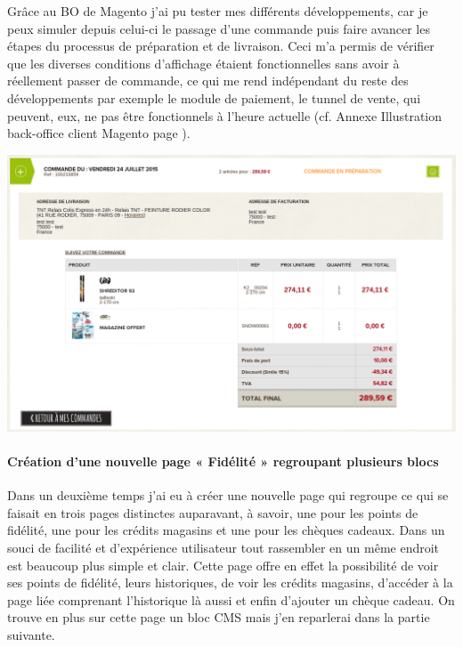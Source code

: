 \documentclass[a4paper,11pt,twoside]{report}
\begin{document}
    	Grâce au BO de Magento j'ai pu tester mes différents développements, car je peux simuler depuis celui-ci le passage d'une commande puis faire avancer les étapes du processus de préparation et de livraison. Ceci m'a permis de vérifier que les diverses conditions d'affichage étaient fonctionnelles sans avoir à réellement passer de commande, ce qui me rend indépendant du reste des développements par exemple le module de paiement, le tunnel de vente, qui peuvent, eux, ne pas être fonctionnels à l'heure actuelle (cf. Annexe Illustration back-office client Magento page \pageref{SL_BO_customer}).
	\begin{center}
	  \includegraphics[scale=0.3]{images/SL_command_detail1.png} 
	  \label{SL_command_detail1}
	\end{center}
    	\paragraph*{Création d'une nouvelle page « Fidélité » regroupant plusieurs blocs}
    	Dans un deuxième temps j'ai eu à créer une nouvelle page qui regroupe ce qui se faisait en trois pages distinctes auparavant, à savoir, une pour les points de fidélité, une pour les crédits magasins et une pour les chèques cadeaux. Dans un souci de facilité et d'expérience utilisateur tout rassembler en un même endroit est beaucoup plus simple et clair. Cette page offre en effet la possibilité de voir ses points de fidélité, leurs historiques, de voir les crédits magasins, d'accéder à la page liée comprenant l'historique là aussi et enfin d'ajouter un chèque cadeau. On trouve en plus sur cette page un bloc CMS mais j'en reparlerai dans la partie suivante.
    
\end{document}
